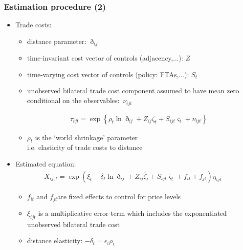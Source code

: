 \documentclass{beamer}
\begin{document}
\begin{frame}[plain]\frametitle{Estimation procedure (2)}
\begin{itemize}
\item Trade costs: 
	\begin{itemize}
	\item distance parameter: $\eth_{ij}$
	\item time-invariant cost vector of controls (adjacency,...): $Z$
	\item time-varying cost vector of controls (policy: FTAs,...): $S_t$
	\item unobserved bilateral trade cost component assumed to have mean zero conditional on the observables: $\nu_{ijt}$ 

\begin{gather}
\tau_{ijt}=\exp\left\{\rho_t\ln{\eth_{ij}}+{Z_{ij}}\zeta_{t}+{S_{ijt}}\varsigma_{t}+\nu_{ijt}\right\} \nonumber
\end{gather}
	\item $\rho_t$ is the `world shrinkage' parameter \\ 
\hspace{1cm} i.e. elasticity of trade costs to distance
	\end{itemize}
\item Estimated equation:
\begin{gather}
X_{ij,t}=\exp{\left(\xi_t-\delta_{t}\ln{\eth_{ij}}+{Z_{ij}}\tilde{\zeta_{t}}+{S_{ijt}}\tilde{\varsigma_{t}}+f_{it}+f_{jt}\right)\eta_{ijt}} \nonumber
\end{gather}
	\begin{itemize}
	\item $f_{it}$ and $f_{jt}$are fixed effects to control for price levels
	\item $\xi_{ijt}$ is a multiplicative error term which includes the exponentiated unobserved bilateral trade cost
	\item distance elasticity: $-\delta_{t}=\epsilon_{t}\rho_t$
	\end{itemize}
\end{itemize}
\end{frame}
\end{document}
